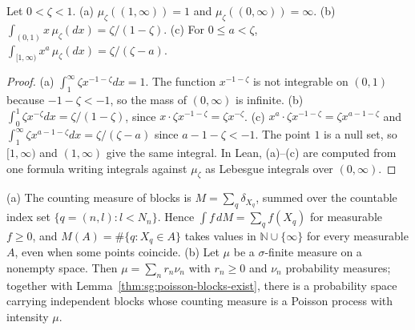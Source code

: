 \begin{lemma}\label{lem:sg:pd-moments}
  \leanok
Let $0<\zeta<1$. (a) $\mu_\zeta((1,\infty))=1$ and $\mu_\zeta((0,\infty))=\infty$. (b) $\int_{(0,1)}x\,\mu_\zeta(dx)=\zeta/(1-\zeta)$. (c) For $0\le a<\zeta$, $\int_{[1,\infty)}x^a\,\mu_\zeta(dx)=\zeta/(\zeta-a)$.
\end{lemma}

\begin{proof}
  \leanok
(a) $\int_1^\infty\zeta x^{-1-\zeta}dx=1$. The function $x^{-1-\zeta}$ is not integrable on $(0,1)$ because $-1-\zeta<-1$, so the mass of $(0,\infty)$ is infinite. (b) $\int_0^1\zeta x^{-\zeta}dx=\zeta/(1-\zeta)$, since $x\cdot\zeta x^{-1-\zeta}=\zeta x^{-\zeta}$. (c) $x^a\cdot\zeta x^{-1-\zeta}=\zeta x^{a-1-\zeta}$ and $\int_1^\infty\zeta x^{a-1-\zeta}dx=\zeta/(\zeta-a)$ since $a-1-\zeta<-1$. The point $1$ is a null set, so $[1,\infty)$ and $(1,\infty)$ give the same integral. In Lean, (a)--(c) are computed from one formula writing integrals against $\mu_\zeta$ as Lebesgue integrals over $(0,\infty)$.
\end{proof}

\begin{lemma}\label{lem:sg:pd-atomic}
  \leanok
{}
(a) The counting measure of blocks is $M=\sum_{q}\delta_{X_q}$, summed over the countable index set $\{q=(n,l):l<N_n\}$. Hence $\int f\,dM=\sum_qf(X_q)$ for measurable $f\ge0$, and $M(A)=\#\{q:X_q\in A\}$ takes values in $\mathbb N\cup\{\infty\}$ for every measurable $A$, even when some points coincide. (b) Let $\mu$ be a $\sigma$-finite measure on a nonempty space. Then $\mu=\sum_nr_n\nu_n$ with $r_n\ge0$ and $\nu_n$ probability measures; together with Lemma~\ref{thm:sg:poisson-blocks-exist}, there is a probability space carrying independent blocks whose counting measure is a Poisson process with intensity $\mu$.
\end{lemma}

